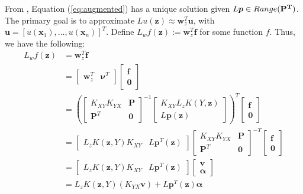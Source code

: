 \documentclass[11pt]{article}
\begin{document}
From \cite{Davydov2020}, Equation (\ref{eq:augmented}) has a unique solution given $L\bm{p} \in Range(\bf{P}^T)$. The primary goal is to approximate $Lu(\bm{z}) \approx \bm{w}^T_z \bm{u}$, with $\bm{u}=\left[ u(\bm{x}_1), \hdots, u(\bm{x}_n) \right]^T$. Define $L_w f(\bm{z}) := \bm{w}^T_z \bm{f}$ for some function $f$. Thus, we have the following:
\begin{align*}
	L_w f(\bm{z}) &= \bm{w}^T_z \bm{f}\\
			&= \begin{bmatrix}
					\bm{w}^T_z & \bm{\nu}^T
				\end{bmatrix}
				\begin{bmatrix}
					\bm{f} \\ \bm{0}
				\end{bmatrix}\\
			&= \left(
	\begin{bmatrix}
		K_{XY} K_{YX} & \bm{P} \\
		\bm{P}^T & \bm{0}
	\end{bmatrix}^{-1}
	\begin{bmatrix}
		K_{XY} L_z K(Y,\bm{z}) \\ L\bm{p}(\bm{z})
	\end{bmatrix}
				\right)^T 
				\begin{bmatrix}
					\bm{f} \\ \bm{0}
				\end{bmatrix}\\
			&= \begin{bmatrix}
					L_z K(\bm{z},Y) K_{XY} & L\bm{p}^T(\bm{z})
				\end{bmatrix}
	\begin{bmatrix}
		K_{XY} K_{YX} & \bm{P} \\
		\bm{P}^T & \bm{0}
	\end{bmatrix}^{-T}
				\begin{bmatrix}
					\bm{f} \\ \bm{0}
				\end{bmatrix}\\
			&= \begin{bmatrix}
					L_z K(\bm{z},Y) K_{XY} & L\bm{p}^T(\bm{z})
				\end{bmatrix}
				\begin{bmatrix}
					\bm{v} \\ \bm{\alpha}
				\end{bmatrix}\\
			&= L_z K(\bm{z},Y) \left(K_{YX} \bm{v}\right) + L\bm{p}^T (\bm{z}) \bm{\alpha}
\end{align*}
\end{document}
